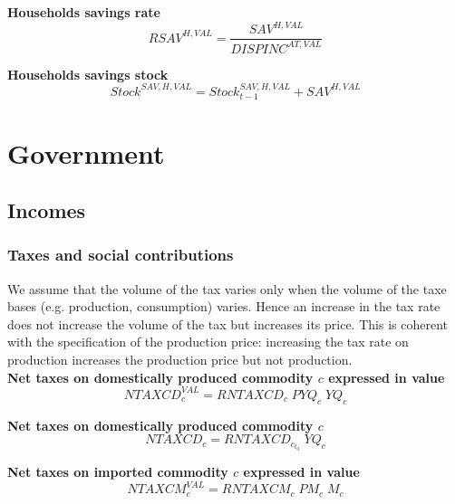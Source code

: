 \documentclass[12pt]{article}
\numberwithin{equation}{section}
\begin{document}
\noindent \textbf{Households savings rate} 
\begin{dmath}
RSAV^{H,VAL} = \frac{SAV^{H,VAL}}{DISPINC^{AT,VAL}}
\label{consumer.mdlRSAV_H_VAL}
\end{dmath}

\noindent \textbf{Households savings stock} 
\begin{dmath}
Stock^{SAV,H,VAL} = Stock^{SAV,H,VAL}_{t-1} + SAV^{H,VAL}
\label{consumer.mdlStock_SAV_H_VAL}
\end{dmath}


\section{Government}





\subsection{Incomes}





\subsubsection{Taxes and social contributions}



We assume that the volume of the tax varies only when the volume of the taxe bases (e.g. production, consumption) varies. Hence an increase in the tax rate does not increase the volume of the tax but increases its price. This is coherent with the specification of the production price: increasing the tax rate on production increases the production price but not production. \\

\noindent \textbf{Net taxes on domestically produced commodity $c$ expressed in value} 
\begin{dmath}
NTAXCD^{VAL}_{c} = RNTAXCD_{c} \; PYQ_{c} \; YQ_{c}
\label{government.mdlNTAXCD_VAL[c]}
\end{dmath}

\noindent \textbf{Net taxes on domestically produced commodity $c$} 
\begin{dmath}
NTAXCD_{c} = RNTAXCD_{c}_{t_0} \; YQ_{c}
\label{government.mdlNTAXCD[c]}
\end{dmath}

\noindent \textbf{Net taxes on imported commodity $c$ expressed in value} 
\begin{dmath}
NTAXCM^{VAL}_{c} = RNTAXCM_{c} \; PM_{c} \; M_{c}
\label{government.mdlNTAXCM_VAL[c]}
\end{dmath}
\end{document}
